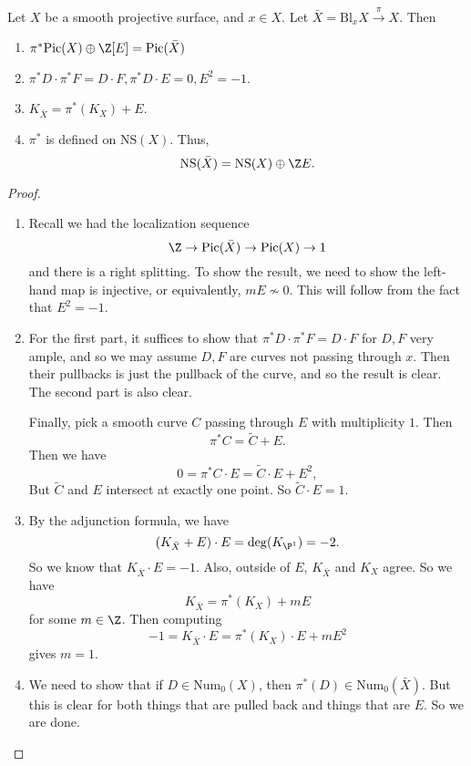 \documentclass[a4paper]{article}
\newcommand\Pic{\mathrm{Pic}}
\newcommand\Num{\mathrm{Num}}
\newcommand\NS{\mathrm{NS}}
\newcommand\Bl{\mathrm{Bl}}
\begin{document}
\begin{prop}
  Let $X$ be a smooth projective surface, and $x \in X$. Let $\bar{X} = \Bl_x X \overset{\pi}{\to} X$. Then
  \begin{enumerate}
    \item $\pi^* \Pic(X) \oplus \Z[E] = \Pic(\bar{X})$
    \item $\pi^*D \cdot \pi^* F = D \cdot F, \pi^* D \cdot E = 0, E^2 = -1$.
    \item $K_{\bar{X}} = \pi^* (K_X) + E$.
    \item $\pi^*$ is defined on $\NS(X)$. Thus,
      \[
        \NS(\bar{X}) = \NS(X) \oplus \Z E.
      \]
  \end{enumerate}
\end{prop}

\begin{proof}\leavevmode
  \begin{enumerate}
    \item Recall we had the localization sequence
      \[
        \Z \to \Pic(\bar{X}) \to \Pic(X) \to 1
      \]
      and there is a right splitting. To show the result, we need to show the left-hand map is injective, or equivalently, $m E \not\sim 0$. This will follow from the fact that $E^2 = -1$.
    \item For the first part, it suffices to show that $\pi^* D \cdot \pi^* F = D \cdot F$ for $D, F$ very ample, and so we may assume $D, F$ are curves not passing through $x$. Then their pullbacks is just the pullback of the curve, and so the result is clear. The second part is also clear.

      Finally, pick a smooth curve $C$ passing through $E$ with multiplicity $1$. Then
      \[
        \pi^*C = \tilde{C} + E.
      \]
      Then we have
      \[
        0 = \pi^* C \cdot E = \tilde{C} \cdot E + E^2,
      \]
      But $\tilde{C}$ and $E$ intersect at exactly one point. So $\tilde{C} \cdot E = 1$.
    \item By the adjunction formula, we have
      \[
        (K_{\bar{X}} + E) \cdot E = \deg(K_{\P^1}) = -2.
      \]
      So we know that $K_{\bar{X}} \cdot E = -1$. Also, outside of $E$, $K_{\bar{X}}$ and $K_X$ agree. So we have
      \[
        K_{\bar{X}} = \pi^* (K_X) + mE
      \]
      for some $m \in \Z$. Then computing
      \[
        -1 = K_{\bar{X}} \cdot E = \pi^*(K_X) \cdot E + mE^2
      \]
      gives $m = 1$.
    \item We need to show that if $D \in \Num_0(X)$, then $\pi^*(D) \in \Num_0(\bar{X})$. But this is clear for both things that are pulled back and things that are $E$. So we are done.\qedhere
  \end{enumerate}
\end{proof}
\end{document}
